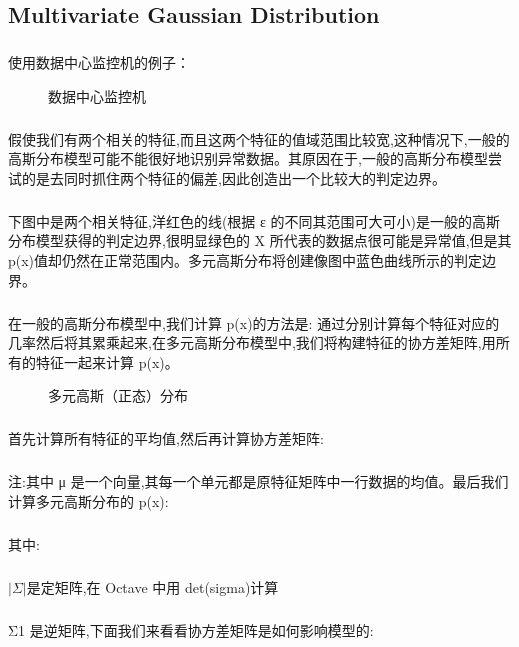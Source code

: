 \documentclass{article}
\begin{document}
\begin{CJK}{UTF8}{gbsn}
\subsection{Multivariate Gaussian Distribution}
\subparagraph{}
使用数据中心监控机的例子：
\begin{figure}[H]
\label{fig:950}
\caption{数据中心监控机}
\end{figure}
\subparagraph{}
假使我们有两个相关的特征,而且这两个特征的值域范围比较宽,这种情况下,一般的高斯分布模型可能不能很好地识别异常数据。其原因在于,一般的高斯分布模型尝试的是去同时抓住两个特征的偏差,因此创造出一个比较大的判定边界。
\subparagraph{}
下图中是两个相关特征,洋红色的线(根据 ε 的不同其范围可大可小)是一般的高斯分布模型获得的判定边界,很明显绿色的 X 所代表的数据点很可能是异常值,但是其 p(x)值却仍然在正常范围内。多元高斯分布将创建像图中蓝色曲线所示的判定边界。
\subparagraph{}
在一般的高斯分布模型中,我们计算 p(x)的方法是: 通过分别计算每个特征对应的几率然后将其累乘起来,在多元高斯分布模型中,我们将构建特征的协方差矩阵,用所有的特征一起来计算 p(x)。
\begin{figure}[H]
\label{fig:952}
\caption{多元高斯（正态）分布}
\end{figure}
\subparagraph{}
首先计算所有特征的平均值,然后再计算协方差矩阵:
\begin{figure}[H]
\label{fig:953}
\end{figure}
\subparagraph{}
注:其中 μ 是一个向量,其每一个单元都是原特征矩阵中一行数据的均值。最后我们计算多元高斯分布的 p(x):
\begin{figure}[H]
\label{fig:954}
\end{figure}
\subparagraph{}
其中:
\subparagraph{}
$|\Sigma|$是定矩阵,在 Octave 中用 det(sigma)计算
\subparagraph{}
Σ1 是逆矩阵,下面我们来看看协方差矩阵是如何影响模型的:
\begin{figure}[H]
\label{fig:960}
\end{figure}
\begin{figure}[H]
\label{fig:961}
\end{figure}
\begin{figure}[H]
\label{fig:963}
\end{figure}
\begin{figure}[H]

\end{figure}
\end{CJK}
\end{document}
